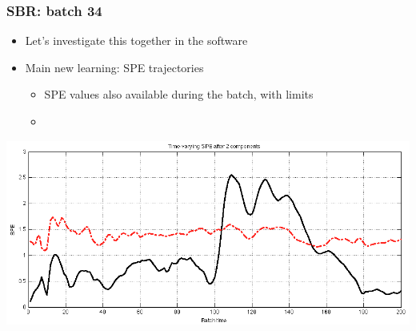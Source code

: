 \begin{frame}\frametitle{SBR:  batch 34}
	
	\begin{itemize}		
		\item	Let's investigate this together in the software
		
		\item	Main new learning: SPE trajectories
		
				\begin{itemize}
					\item	SPE values also available during the batch, with limits
					
					\item	{}
					
				\end{itemize}
	\end{itemize}
				
	\begin{center}
		\includegraphics[width=\textwidth]{images/sbr/SBR-time-evolving-SPE-batch-34.png}
	\end{center}
\end{frame}





